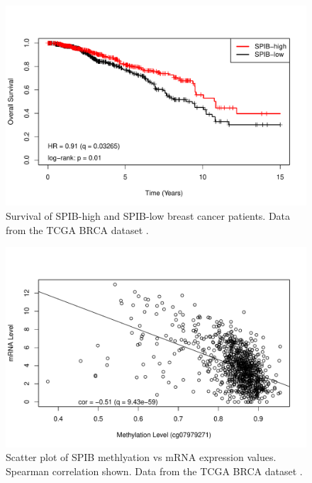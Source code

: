 \begin{figure}[!p]
    \centering
    \includegraphics[scale=0.70]{figures/km_plot.pdf}
    \caption{Survival of SPIB-high and SPIB-low breast cancer patients. Data from the TCGA BRCA dataset \cite{Ciriello2015, Goldman2018}.}
    \label{km_plot}
\end{figure} 
\clearpage

\clearpage
\begin{figure}[!p]
    \centering
    \includegraphics[scale=0.75]{figures/methylation.pdf}
    \caption{Scatter plot of SPIB methlyation vs mRNA expression values. Spearman correlation shown. Data from the TCGA BRCA dataset \cite{Ciriello2015, Goldman2018}.}
    \label{methylation}
\end{figure} 
\clearpage
